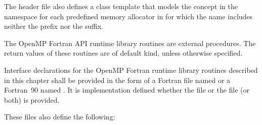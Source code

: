 \begin{cppspecific}
The  header file also defines a class template that
models the  concept in the 
namespace for each predefined memory allocator in
 for which the name includes
neither the  prefix nor the  suffix.
\end{cppspecific}

\begin{fortranspecific}
The OpenMP Fortran API runtime library routines are external procedures. The 
return values of these routines are of default kind, unless otherwise specified.

Interface declarations for the OpenMP Fortran runtime library routines 
described in this chapter shall be provided in the form of a Fortran 
 file named  or a Fortran~90  
named . It is implementation defined whether the
 file or the  file (or both) is provided.

These files also define the following:


\end{fortranspecific}
